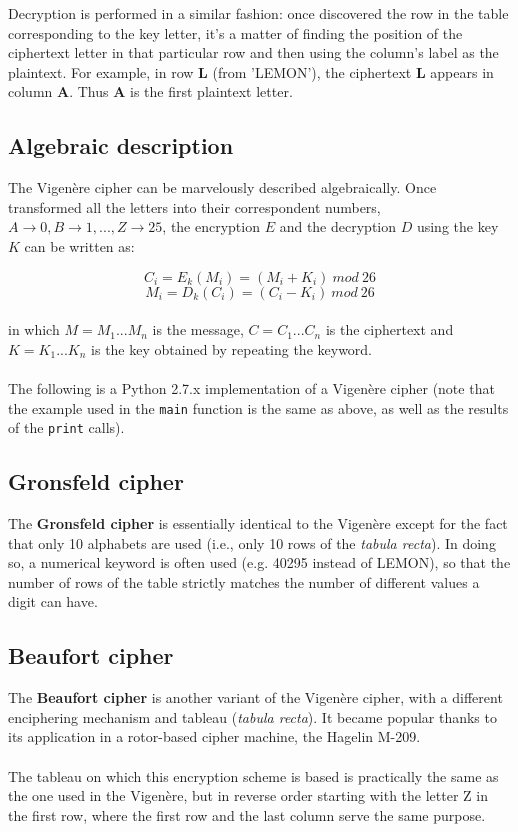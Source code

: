 \documentclass[Lau,binding=0.6cm,oneside]{sapthesis}
\begin{document}
Decryption is performed in a similar fashion: once discovered the row in the table corresponding to the key letter, it's a matter of finding the position of the ciphertext letter in that particular row and then using the column's label as the plaintext. For example, in row \textbf{L} (from 'LEMON'), the ciphertext \textbf{L} appears in column \textbf{A}. Thus \textbf{A} is the first plaintext letter.

\subsection{Algebraic description}
The Vigenère cipher can be marvelously described algebraically. Once transformed all the letters into their correspondent numbers, $A \rightarrow 0, B \rightarrow 1, ... , Z \rightarrow 25$, the encryption $E$ and the decryption $D$ using the key $K$ can be written as:

\begin{equation}
C_i=E_k{(M_i)}=(M_i + K_i) \ mod \ 26
\end{equation}
\begin{equation}
M_i=D_k{(C_i)}=(C_i - K_i) \ mod \ 26
\end{equation}
\ \\
in which $M = M_1 ... M_n$ is the message, $C = C_1 ... C_n$ is the ciphertext and $K = K_1 ... K_n$ is the key obtained by repeating the keyword.\\\\
The following is a \textsf{Python 2.7.x} implementation of a Vigenère cipher (note that the example used in the \texttt{main} function is the same as above, as well as the results of the \texttt{print} calls).
\ \\
\subsection{Gronsfeld cipher}
The \textbf{Gronsfeld cipher} is essentially identical to the Vigenère except for the fact that only 10 alphabets are used (i.e., only 10 rows of the \textit{tabula recta}). In doing so, a numerical keyword is often used (e.g. 40295 instead of LEMON), so that the number of rows of the table strictly matches the number of different values a digit can have.

\subsection{Beaufort cipher}
The \textbf{Beaufort cipher} is another variant of the Vigenère cipher, with a different enciphering mechanism and tableau (\textit{tabula recta}). It became popular thanks to its application in a rotor-based cipher machine, the Hagelin M-209.\\\\
The tableau on which this encryption scheme is based is practically the same as the one used in the Vigenère, but in reverse order starting with the letter Z in the first row, where the first row and the last column serve the same purpose.\\\\
\end{document}
